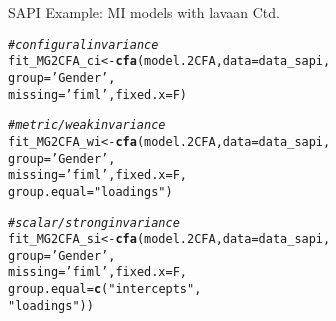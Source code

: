 \documentclass[10pt]{beamer}\usepackage[]{graphicx}\usepackage[]{xcolor}
\makeatletter
\newcommand{\hlsng}[1]{\textcolor[rgb]{0.192,0.494,0.8}{#1}}%
\newcommand{\hlcom}[1]{\textcolor[rgb]{0.678,0.584,0.686}{\textit{#1}}}%
\newcommand{\hldef}[1]{\textcolor[rgb]{0.345,0.345,0.345}{#1}}%
\newcommand{\hlkwb}[1]{\textcolor[rgb]{0.69,0.353,0.396}{#1}}%
\newcommand{\hlkwc}[1]{\textcolor[rgb]{0.333,0.667,0.333}{#1}}%
\newcommand{\hlkwd}[1]{\textcolor[rgb]{0.737,0.353,0.396}{\textbf{#1}}}%
\newenvironment{kframe}{%
 \def\at@end@of@kframe{}%
 \ifinner\ifhmode%
  \def\at@end@of@kframe{\end{minipage}}%
  \begin{minipage}{\columnwidth}%
 \fi\fi%
 \def\FrameCommand##1{\hskip\@totalleftmargin \hskip-\fboxsep
 \colorbox{shadecolor}{##1}\hskip-\fboxsep
     \hskip-\linewidth \hskip-\@totalleftmargin \hskip\columnwidth}%
 \MakeFramed {\advance\hsize-\width
   \@totalleftmargin\z@ \linewidth\hsize
   \@setminipage}}%
 {\par\unskip\endMakeFramed%
 \at@end@of@kframe}
\newenvironment{knitrout}{}{} %
\makeatother
\begin{document}
\begin{frame}[fragile]{SAPI Example: MI models with lavaan Ctd.}

\begin{knitrout}
\color{fgcolor}\begin{kframe}
\begin{alltt}
\hlcom{# configural invariance}
\hldef{fit_MG2CFA_ci} \hlkwb{<-} \hlkwd{cfa}\hldef{(model.2CFA,} \hlkwc{data}\hldef{=data_sapi,}
                     \hlkwc{group} \hldef{=} \hlsng{'Gender'}\hldef{,}
                     \hlkwc{missing}\hldef{=}\hlsng{'fiml'}\hldef{,} \hlkwc{fixed.x}\hldef{=F)}

\hlcom{# metric/weak invariance}
\hldef{fit_MG2CFA_wi} \hlkwb{<-} \hlkwd{cfa}\hldef{(model.2CFA,} \hlkwc{data}\hldef{=data_sapi,}
                     \hlkwc{group} \hldef{=} \hlsng{'Gender'}\hldef{,}
                     \hlkwc{missing}\hldef{=}\hlsng{'fiml'}\hldef{,} \hlkwc{fixed.x}\hldef{=F,}
                     \hlkwc{group.equal} \hldef{=} \hlsng{"loadings"}\hldef{)}

\hlcom{# scalar/strong invariance}
\hldef{fit_MG2CFA_si} \hlkwb{<-} \hlkwd{cfa}\hldef{(model.2CFA,} \hlkwc{data}\hldef{=data_sapi,}
                     \hlkwc{group} \hldef{=} \hlsng{'Gender'}\hldef{,}
                     \hlkwc{missing}\hldef{=}\hlsng{'fiml'}\hldef{,} \hlkwc{fixed.x}\hldef{=F,}
                     \hlkwc{group.equal} \hldef{=} \hlkwd{c}\hldef{(}\hlsng{"intercepts"}\hldef{,}
                                     \hlsng{"loadings"}\hldef{))}
\end{alltt}
\end{kframe}
\end{knitrout}

\end{frame}
%
\end{document}
